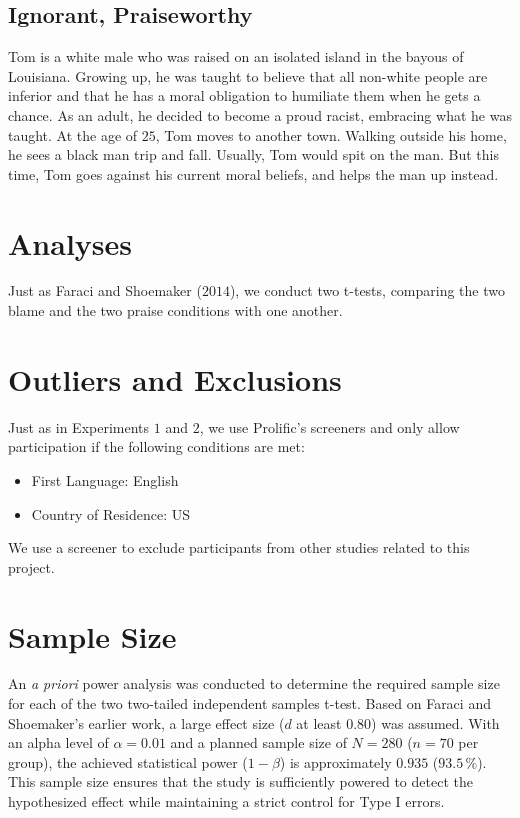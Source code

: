 \documentclass[scrarticle]{scrartcl}
\begin{document}
\subsection*{Ignorant, Praiseworthy}
Tom is a white male who was raised on an isolated island in the bayous of Louisiana.
Growing up, he was taught to believe that all non-white people are inferior and that he has a moral obligation to humiliate them when he gets a chance.
As an adult, he decided to become a proud racist, embracing what he was taught.
At the age of $25$, Tom moves to another town.
Walking outside his home, he sees a black man trip and fall.
Usually, Tom would spit on the man.
But this time, Tom goes against his current moral beliefs, and helps the man up instead.


\section{Analyses}
Just as Faraci and Shoemaker ($2014$), we conduct two t-tests, comparing the two blame and the two praise conditions with one another.


\section{Outliers and Exclusions}
Just as in Experiments $1$ and $2$, we use Prolific's screeners and only allow participation if the following conditions are met:

\begin{itemize}
   \item[] First Language: English
   \item[] Country of Residence: US
\end{itemize}

\noindent We use a screener to exclude participants from other studies related to this project.


\section{Sample Size}
An \textit{a priori} power analysis was conducted to determine the required sample size for each of the two two-tailed independent samples t-test.
Based on Faraci and Shoemaker's earlier work, a large effect size ($d$ at least $0.80$) was assumed.
With an alpha level of $\alpha = 0.01$ and a planned sample size of $N = 280$ ($n = 70$ per group), the achieved statistical power ($1 - \beta$) is approximately $0.935$ ($93.5\,\%$).
This sample size ensures that the study is sufficiently powered to detect the hypothesized effect while maintaining a strict control for Type I errors.
\end{document}
